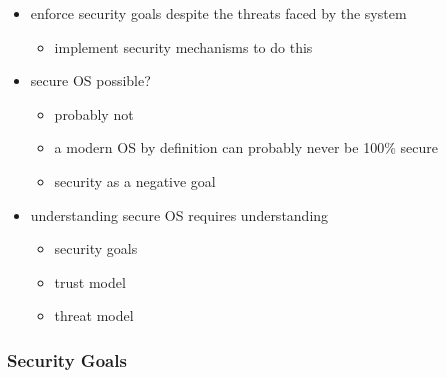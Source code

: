 \documentclass[
  12pt]{findlay}
\providecommand{\tightlist}{%
  \setlength{\itemsep}{0pt}\setlength{\parskip}{0pt}}
\begin{document}
\begin{itemize}
\tightlist
\item
  enforce security goals despite the threats faced by the system

  \begin{itemize}
  \tightlist
  \item
    implement security mechanisms to do this
  \end{itemize}
\item
  secure OS possible?

  \begin{itemize}
  \tightlist
  \item
    probably not
  \item
    a modern OS by definition can probably never be 100\% secure
  \item
    security as a negative goal
  \end{itemize}
\item
  understanding secure OS requires understanding

  \begin{itemize}
  \tightlist
  \item
    security goals
  \item
    trust model
  \item
    threat model
  \end{itemize}
\end{itemize}

\hypertarget{security-goals}{%
\subsubsection{Security Goals}\label{security-goals}}
\end{document}
